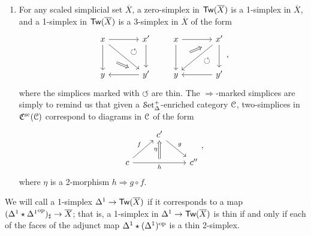 \documentclass[main.tex]{subfiles}
\begin{document}
\begin{enumerate}
  \item For any scaled simplicial set $\overline{X}$, a zero-simplex in $\mathsf{Tw}(\overline{X})$ is a 1-simplex in $\overline{X}$, and a 1-simplex in $\mathsf{Tw}(\overline{X})$ is a 3-simplex in $\overline{X}$ of the form
    \begin{equation*}
      \begin{tikzcd}[column sep=large, row sep=large]
        x
        \arrow[r]
        \arrow[d, ""{name=L, right}]
        \arrow[dr]
        & x'
        \arrow[d, ""{name=R, left}]
        \arrow[from=l, to=R, phantom, near end, "\circlearrowleft"{description}]
        \\
        y
        & y'
        \arrow[l]
        \arrow[from=L, Rightarrow, shorten=3ex]
      \end{tikzcd}
      \qquad
      \begin{tikzcd}[column sep=large, row sep=large]
        x
        \arrow[r]
        \arrow[d, ""{name=L, right}]
        & x'
        \arrow[d, ""{name=R, left}]
        \arrow[dl]
        \\
        y
        \arrow[from=R, phantom, near start, "\circlearrowleft"{description}]
        & y'
        \arrow[l]
        \arrow[from=L, to=u, shorten=3ex, Rightarrow]
      \end{tikzcd},
    \end{equation*}
    where the simplices marked with $\circlearrowleft$ are thin. The $\Rightarrow$-marked simplices are simply to remind us that given a $\mathcal{S}\mathrm{et}_{\Delta}^{+}$-enriched category $\mathcal{C}$, two-simplices in $\mathfrak{C}^{\mathrm{sc}}(\mathcal{C})$ correspond to diagrams in $\mathcal{C}$ of the form
    \begin{equation*}
      \begin{tikzcd}
        & c'
        \arrow[dr, "g"]
        \\
        c
        \arrow[ur, "f"]
        \arrow[rr, "h"{below}, ""{name=B, above}]
        && c''
        \arrow[from=B, to=ul, Rightarrow, "\eta"]
      \end{tikzcd},
    \end{equation*}
    where $\eta$ is a 2-morphism $h \Rightarrow g \circ f$.
\end{enumerate}

\begin{definition}
  We will call a 1-simplex $\Delta^{1} \to \mathsf{Tw}(\overline{X})$  if it corresponds to a map $(\Delta^{1} \star {\Delta^{1}}^{\mathrm{op}})_{\sharp} \to \overline{X}$; that is, a 1-simplex in $\Delta^{1} \to \mathsf{Tw}(\overline{X})$ is thin if and only if each of the faces of the adjunct map $\Delta^{1} \star (\Delta^{1})^{\mathrm{op}}$ is a thin 2-simplex.
\end{definition}
\end{document}
